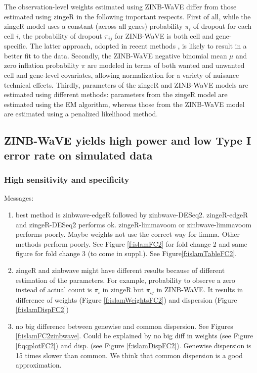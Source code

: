 \documentclass{article}
\begin{document}
The observation-level weights estimated using ZINB-WaVE differ from those estimated using zingeR in the following important respects. First of all, while the zingeR model uses a constant (across all genes) probability $\pi_i$ of dropout for each cell $i$, the probability of dropout $\pi_{ij}$ for ZINB-WaVE is both cell and gene-specific. The latter approach, adopted in recent methods \cite{Pierson2015ZIFA:Analysis} \cite{Finak2015MAST:Data}, is likely to result in a better fit to the data. Secondly, the ZINB-WaVE negative binomial mean $\mu$ and zero inflation probability $\pi$ are modeled in terms of both wanted and unwanted cell and gene-level covariates, allowing normalization for a variety of nuisance technical effects. Thirdly, parameters of the zingeR and ZINB-WaVE models are estimated using different methods: parameters from the zingeR model are estimated using the EM algorithm, whereas those from the ZINB-WaVE model are estimated using a penalized likelihood method.

\subsection*{ZINB-WaVE yields high power and low Type I error rate on simulated data}

\subsubsection*{High sensitivity and specificity}
Messages:
\begin{enumerate}
\item best method is zinbwave-edgeR followed by zinbwave-DESeq2. zingeR-edgeR and zingeR-DESeq2 performs ok. zingeR-limmavoom or zinbwave-limmavoom performs poorly. Maybe weights not use the correct way for limma. Other methods perform poorly. See Figure \ref{f:islamFC2} for fold change 2 and same figure for fold change 3 (to come in suppl.). See Figure\ref{f:islamTableFC2}.
\item zingeR and zinbwave might have different results because of different estimation of the parameters. For example, probability to observe a zero instead of actual count is $\pi_i$ in zingeR but $\pi_{ij}$ in ZINB-WaVE. It results in difference of weights (Figure \ref{f:islamWeightsFC2}) and dispersion (Figure \ref{f:islamDispFC2})
\item no big difference between genewise and common dispersion. See Figures \ref{f:islamFC2zinbwave}. Could be explained by no big diff in weights (see Figure \ref{f:qqplotFC2}) and disp. (see Figure \ref{f:islamDispFC2}). Genewise dispersion is 15 times slower than common. We think that common dispersion is a good approximation. 
\end{enumerate}
\end{document}
